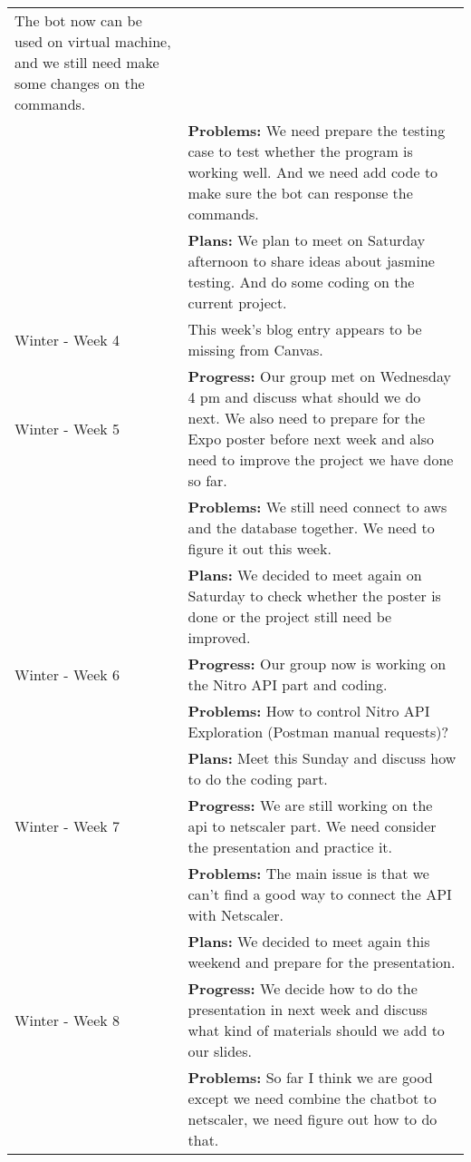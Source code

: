 \begin{longtable}[ht]{| p{1.5cm} | p{13.5cm} |}
     The bot now can be used on virtual machine, and we still need make some changes on the commands.
     \\ & \textbf{Problems:}
     We need prepare the testing case to test whether the program is working well.
     And we need add code to make sure the bot can response the commands.
     \\ & \textbf{Plans:}
     We plan to meet on Saturday afternoon to share ideas about jasmine testing.
     And do some coding on the current project.
     \\
     \hline
     Winter - Week 4 &
     This week's blog entry appears to be missing from Canvas.
     \\
     \hline
     Winter - Week 5 &
     \textbf{Progress:}
     Our group met on Wednesday 4 pm and discuss what should we do next.
     We also need to prepare for the Expo poster before next week and also need to improve the project we have done so far.
     \\ & \textbf{Problems:}
     We still need connect to aws and the database together.
     We need to figure it out this week.
     \\ & \textbf{Plans:}
     We decided to meet again on Saturday to check whether the poster is done or the project still need be improved.
     \\
     \hline
     Winter - Week 6 &
     \textbf{Progress:}
     Our group now is working on the Nitro API part and coding.
     \\ & \textbf{Problems:}
     How to control Nitro API Exploration (Postman manual requests)?
     \\ & \textbf{Plans:}
     Meet this Sunday and discuss how to do the coding part.
     \\
     \hline
     Winter - Week 7 &
     \textbf{Progress:}
     We are still working on the api to netscaler part.
     We need consider the presentation and practice it.
     \\ & \textbf{Problems:}
     The main issue is that we can't find a good way to connect the API with Netscaler. 
     \\ & \textbf{Plans:}
     We decided to meet again this weekend and prepare for the presentation. 
     \\
     \hline
     Winter - Week 8 &
     \textbf{Progress:}
     We decide how to do the presentation in next week and discuss what kind of materials should we add to our slides. 
     \\ & \textbf{Problems:}
     So far I think we are good except we need combine the chatbot to netscaler, we need figure out how to do that.

\end{longtable}
